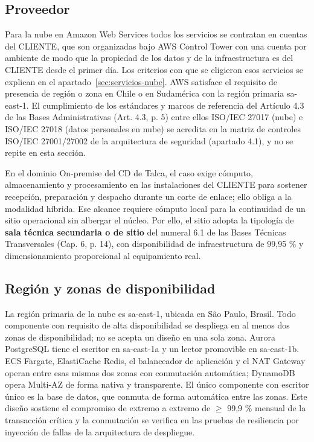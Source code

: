 \subsection{Proveedor}

Para la nube en Amazon Web Services todos los servicios se contratan en cuentas del CLIENTE, que son organizadas bajo AWS Control Tower con una cuenta por ambiente de modo que la propiedad de los datos y de la infraestructura es del CLIENTE desde el primer día. Los criterios con que se eligieron esos servicios se explican en el apartado~\ref{sec:servicios-nube}. AWS satisface el requisito de presencia de región o zona en Chile o en Sudamérica con la región primaria sa-east-1. El cumplimiento de los estándares y marcos de referencia del Artículo 4.3 de las Bases Administrativas (Art. 4.3, p. 5) entre ellos ISO/IEC 27017 (nube) e ISO/IEC 27018 (datos personales en nube) se acredita en la matriz de controles ISO/IEC 27001/27002 de la arquitectura de seguridad (apartado 4.1), y no se repite en esta sección.

En el dominio On-premise del CD de Talca, el caso exige cómputo, almacenamiento y procesamiento en las instalaciones del CLIENTE para sostener recepción, preparación y despacho durante un corte de enlace; ello obliga a la modalidad híbrida. Ese alcance requiere cómputo local para la continuidad de un sitio operacional sin albergar el núcleo. Por ello, el sitio adopta la tipología de \textbf{sala técnica secundaria o de sitio} del numeral 6.1 de las Bases Técnicas Transversales (Cap. 6, p. 14), con disponibilidad de infraestructura de 99,95 \% y dimensionamiento proporcional al equipamiento real.

\subsection{Región y zonas de disponibilidad}

La región primaria de la nube es sa-east-1, ubicada en São Paulo, Brasil. Todo componente con requisito de alta disponibilidad se despliega en al menos dos zonas de disponibilidad; no se acepta un diseño en una sola zona. Aurora PostgreSQL tiene el escritor en sa-east-1a y un lector promovible en sa-east-1b. ECS Fargate, ElastiCache Redis, el balanceador de aplicación y el NAT Gateway operan entre esas mismas dos zonas con conmutación automática; DynamoDB opera Multi-AZ de forma nativa y transparente. El único componente con escritor único es la base de datos, que conmuta de forma automática entre las zonas. Este diseño sostiene el compromiso de extremo a extremo de $\geq$ 99,9 \% mensual de la transacción crítica y la conmutación se verifica en las pruebas de resiliencia por inyección de fallas de la arquitectura de despliegue.

